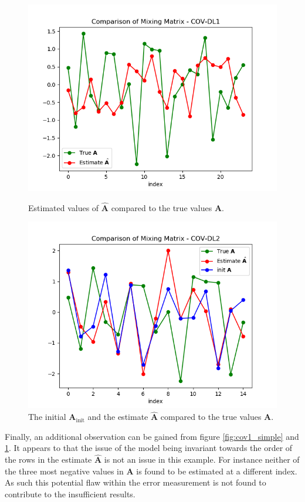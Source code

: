 \begin{figure}[H]
    \begin{minipage}[t]{.45\textwidth}
		\centering
		\includegraphics[scale=0.5]{figures/ch_6/COV1_simple.png}
		\caption{Estimated values of $\hat{\mathbf{A}}$ compared to the true 				values $\mathbf{A}$.}
		\label{fig:cov1_simple}
    \end{minipage} 
    \hfill
    \begin{minipage}[t]{.45\textwidth}
        \centering
		\includegraphics[scale=0.5]{figures/ch_6/COV2_simple.png}
		\caption{The initial $\mathbf{A}_{\text{init}}$ and the estimate $\hat{\mathbf{A}}$ 				compared to the true values $\mathbf{A}$.}
		\label{fig:cov2_simple}
    \end{minipage}
\end{figure}
\noindent
Finally, an additional observation can be gained from figure \ref{fig:cov1_simple} and \ref{fig:cov2_simple}. 
It appears to that the issue of the model being invariant towards the order of the rows in the estimate $\hat{\textbf{A}}$ is not an issue in this example. 
For instance neither of the three most negative values in $\textbf{A}$ is found to be estimated at a different index. 
As such this potential flaw within the error measurement is not found to contribute to the insufficient results. 

